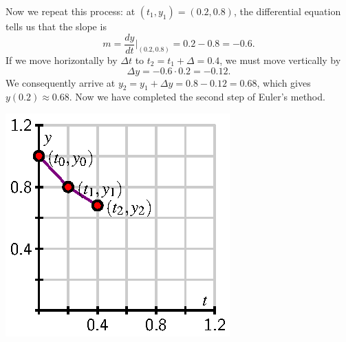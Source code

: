 \medskip
\noindent \begin{minipage}[l]{3.6in}
Now we repeat this process:  at $(t_1,y_1) = (0.2,0.8)$, the
differential equation tells us that the slope is 
$$
m=\frac{dy}{dt}\bigg\vert_{(0.2,0.8)} = 0.2-0.8 = -0.6.
$$
If we move horizontally by $\Delta t$ to $t_2=t_1+\Delta = 0.4$, we must move
vertically by
$$
\Delta y = -0.6\cdot0.2 = -0.12.
$$
We consequently arrive at $y_2=y_1+\Delta y = 0.8-0.12 = 0.68$, which
gives $y(0.2)\approx 0.68$.  Now we have completed the second step of Euler's method.


\end{minipage}
\hspace*{0.25in}
\begin{minipage}[c]{2in}
\includegraphics{figures/7_3_euler_points_2.eps}
\end{minipage}

\medskip

